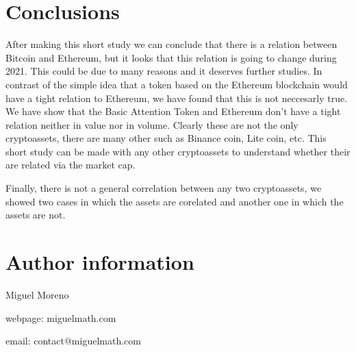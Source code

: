\documentclass[11pt]{article}
\begin{document}
    \section{Conclusions}\label{conclusions}

After making this short study we can conclude that there is a relation
between Bitcoin and Ethereum, but it looks that this relation is going
to change during 2021. This could be due to many reasons and it deserves
further studies. In contrast of the simple idea that a token based on
the Ethereum blockchain would have a tight relation to Ethereum, we have
found that this is not neccesarly true. We have show that the Basic
Attention Token and Ethereum don't have a tight relation neither in
value nor in volume. Clearly these are not the only cryptoassets, there
are many other such as Binance coin, Lite coin, etc. This short study
can be made with any other cryptoassets to understand whether their are
related via the market cap.

Finally, there is not a general correlation between any two
cryptoassets, we showed two cases in which the assets are corelated and
another one in which the assets are not.

\section{Author information}

Miguel Moreno

webpage: miguelmath.com

email: contact@miguelmath.com


    
    
    
    
\end{document}

